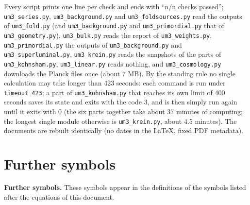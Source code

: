 \documentclass[
  10pt,
]{article}
\begin{document}
Every script prints one line per check and ends with ``n/n checks
passed''; \texttt{um3\_series.py}, \texttt{um3\_background.py} and
\texttt{um3\_foldsources.py} read the outputs of \texttt{um3\_fold.py}
(and \texttt{um3\_background.py} and \texttt{um3\_primordial.py} that of
\texttt{um3\_geometry.py}), \texttt{um3\_bulk.py} reads the report of
\texttt{um3\_weights.py}, \texttt{um3\_primordial.py} the outputs of
\texttt{um3\_background.py} and \texttt{um3\_superluminal.py},
\texttt{um3\_krein.py} reads the snapshots of the parts of
\texttt{um3\_kohnsham.py}, \texttt{um3\_linear.py} reads nothing, and
\texttt{um3\_cosmology.py} downloads the Planck files once (about 7 MB).
By the standing rule no single calculation may take longer than 423
seconds: each command is run under \texttt{timeout\ 423}; a part of
\texttt{um3\_kohnsham.py} that reaches its own limit of 400 seconds
saves its state and exits with the code 3, and is then simply run again
until it exits with 0 (the six parts together take about 37 minutes of
computing; the longest single module otherwise is
\texttt{um3\_krein.py}, about 4.5 minutes). The documents are rebuilt
identically (no dates in the LaTeX, fixed PDF metadata).

\hypertarget{further-symbols}{%
\section{Further symbols}\label{further-symbols}}

\textbf{Further symbols.} These symbols appear in the definitions of the
symbols listed after the equations of this document.
\end{document}
